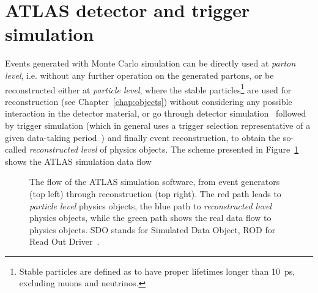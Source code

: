 \section{ATLAS detector and trigger simulation}\label{sec:MCdetector}

Events generated with Monte Carlo simulation can be directly
used at {\it parton level}, i.e. without any further operation on the
generated partons, or be reconstructed either at {\it particle level}, where
the stable particles\footnote{Stable particles are
defined as to have proper lifetimes longer than 10~ps, excluding
muons and neutrinos.} are used for reconstruction (see Chapter~\ref{chap:objects})
without considering any possible interaction in the detector material, 
or go through detector simulation~\cite{atlas_sim} followed by 
trigger simulation (which in general uses a trigger selection
representative of a given data-taking period~\cite{Galster:1622237}) and finally event
reconstruction, to obtain the so-called {\it reconstructed level} of
physics objects. The scheme presented in Figure~\ref{fig:outline}
shows the ATLAS simulation data flow 

\begin{figure}[htb]\begin{center}
	\caption{The flow of the ATLAS simulation software, from event generators (top left) through reconstruction (top right).
        The red path leads to {\it particle level} physics objects, the blue path to
        {\it reconstructed level} physics objects, while the green path shows the real data
        flow to physics objects.
        SDO stands for Simulated Data Object, ROD for Read Out Driver~\cite{atlas_sim}.\label{fig:outline}}
\end{center}\end{figure}

